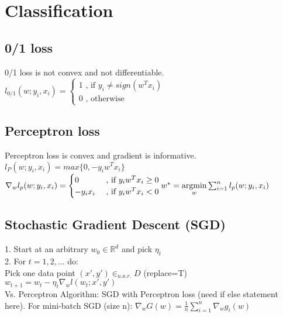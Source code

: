 \section*{Classification}
\subsection*{0/1 loss}
0/1 loss is not convex and not differentiable.\\
$l_{0/1} (w;y_i,x_i) =
\begin{cases}
    1 \text{ , if } y_i \neq sign(w^Tx_i)\\
		0 \text{ , otherwise} 
\end{cases}$

\subsection*{Perceptron loss}
Perceptron loss is convex and gradient is informative.\\
$l_{P} (w;y_i,x_i) = max\{0, -y_i w^T x_i \}$\\
$\nabla_w l_p(w;y_i,x_i) = \begin{cases}
    0 &\text{ , if } y_i w^T x_i \geq 0\\
    -y_i x_i &\text{ , if } y_i w^T x_i <0
\end{cases}\\
w^* = \underset{w}{\operatorname{argmin}} \sum_{i=1}^n l_p (w;y_i,x_i)$

\subsection*{Stochastic Gradient Descent (SGD)}
1. Start at an arbitrary $w_0 \in \mathbb{R}^d$ and pick $\eta_t$\\
2. For $t = 1, 2,  ...$ do: \\
	Pick one data point $(x',y') \in_{u.a.r.} D$ (replace=T)\\
	$w_{t+1} = w_t - \eta_t \nabla_w l(w_t;x',y')$\\
Vs. Perceptron Algorithm: SGD with Perceptron loss (need if else statement here).
For mini-batch SGD (size n): $\nabla_w G(w) = \frac{1}{n}\sum_{i=1}^n\nabla_w g_i(w)$ 


